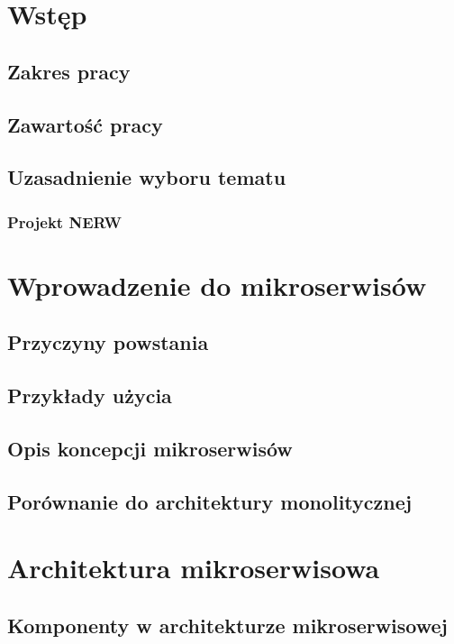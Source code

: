 \documentclass{article}
\author{Krzysztof Berski}
\begin{document}
 
\begin{titlepage}
\end{titlepage}
 
 
\tableofcontents

\section{Wstęp}
	\subsection{Zakres pracy}
	\subsection{Zawartość pracy}
	\subsection{Uzasadnienie wyboru tematu}
	\subsubsection{Projekt NERW}
\section{Wprowadzenie do mikroserwisów}
	\subsection{Przyczyny powstania}
	\subsection{Przykłady użycia}
	\subsection{Opis koncepcji mikroserwisów}
	\subsection{Porównanie do architektury monolitycznej}
\section{Architektura mikroserwisowa}
	\subsection{Komponenty w architekturze mikroserwisowej}
\end{document}
